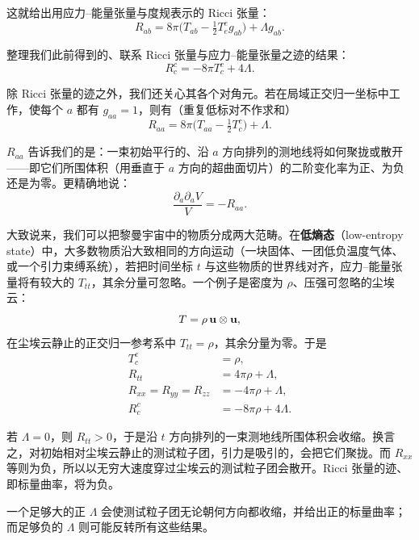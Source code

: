这就给出用应力--能量张量与度规表示的 Ricci 张量：
\begin{equation*}
R_{ab}=8\pi\bigl(T_{ab}-\tfrac{1}{2}T_{e}^{e}g_{ab}\bigr)+\Lambda g_{ab}.
\tag{3}
\end{equation*}

整理我们此前得到的、联系 Ricci 张量与应力--能量张量之迹的结果：
\begin{equation*}
R_{c}^{c}=-8\pi T_{c}^{c}+4\Lambda.
\tag{4}
\end{equation*}

除 Ricci 张量的迹之外，我们还关心其各个对角元。若在局域正交归一坐标中工作，使每个 $a$ 都有 $g_{aa}=1$，则有（重复低标对不作求和）
\begin{equation*}
R_{aa}=8\pi\bigl(T_{aa}-\tfrac{1}{2}T_{c}^{c}\bigr)+\Lambda.
\tag{5}
\end{equation*}

$R_{aa}$ 告诉我们的是：一束初始平行的、沿 $a$ 方向排列的测地线将如何聚拢或散开——即它们所围体积（用垂直于 $a$ 方向的超曲面切片）的二阶变化率为正、为负还是为零。更精确地说：
\begin{equation*}
\frac{\partial_{a}\partial_{a}V}{V}=-R_{aa}.
\end{equation*}

大致说来，我们可以把黎曼宇宙中的物质分成两大范畴。在\textbf{低熵态}（low-entropy state）中，大多数物质沿大致相同的方向运动（一块固体、一团低负温度气体、或一个引力束缚系统），若把时间坐标 $t$ 与这些物质的世界线对齐，应力--能量张量将有较大的 $T_{tt}$，其余分量可忽略。一个例子是密度为 $\rho$、压强可忽略的尘埃云：
\begin{equation*}
T=\rho\,\mathbf{u}\otimes\mathbf{u},
\end{equation*}
在尘埃云静止的正交归一参考系中 $T_{tt}=\rho$，其余分量为零。于是
\begin{align*}
T_{c}^{c} &= \rho, \\
R_{tt} &= 4\pi\rho+\Lambda, \\
R_{xx}=R_{yy}=R_{zz} &= -4\pi\rho+\Lambda, \\
R_{c}^{c} &= -8\pi\rho+4\Lambda.
\end{align*}

若 $\Lambda=0$，则 $R_{tt}>0$，于是沿 $t$ 方向排列的一束测地线所围体积会收缩。换言之，对初始相对尘埃云静止的测试粒子团，引力是吸引的，会把它们聚拢。而 $R_{xx}$ 等则为负，所以以无穷大速度穿过尘埃云的测试粒子团会散开。Ricci 张量的迹、即标量曲率，将为负。

一个足够大的正 $\Lambda$ 会使测试粒子团无论朝何方向都收缩，并给出正的标量曲率；而足够负的 $\Lambda$ 则可能反转所有这些结果。

